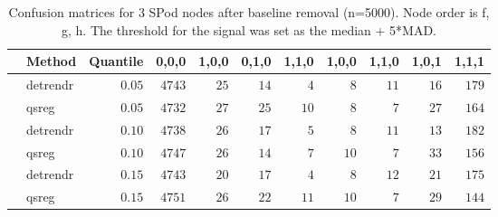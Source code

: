 \begin{table}[!tbp]
\caption{Confusion matrices for 3 SPod nodes after baseline 
      removal (n=5000). Node order is f, g, h. The threshold for the signal was 
      set as the median + 5*MAD.\label{confusion}} 
\begin{center}
\begin{tabular}{llrrrrrrrrr}
\hline\hline
\multicolumn{1}{l}{}&\multicolumn{1}{c}{Method}&\multicolumn{1}{c}{Quantile}&\multicolumn{1}{c}{0,0,0}&\multicolumn{1}{c}{1,0,0}&\multicolumn{1}{c}{0,1,0}&\multicolumn{1}{c}{1,1,0}&\multicolumn{1}{c}{1,0,0}&\multicolumn{1}{c}{1,1,0}&\multicolumn{1}{c}{1,0,1}&\multicolumn{1}{c}{1,1,1}\tabularnewline
\hline
&detrendr&$0.05$&$4743$&$25$&$14$&$ 4$&$ 8$&$11$&$16$&$179$\tabularnewline
&qsreg&$0.05$&$4732$&$27$&$25$&$10$&$ 8$&$ 7$&$27$&$164$\tabularnewline
&detrendr&$0.10$&$4738$&$26$&$17$&$ 5$&$ 8$&$11$&$13$&$182$\tabularnewline
&qsreg&$0.10$&$4747$&$26$&$14$&$ 7$&$10$&$ 7$&$33$&$156$\tabularnewline
&detrendr&$0.15$&$4743$&$20$&$17$&$ 4$&$ 8$&$12$&$21$&$175$\tabularnewline
&qsreg&$0.15$&$4751$&$26$&$22$&$11$&$10$&$ 7$&$29$&$144$\tabularnewline
\hline
\end{tabular}\end{center}
\end{table}
